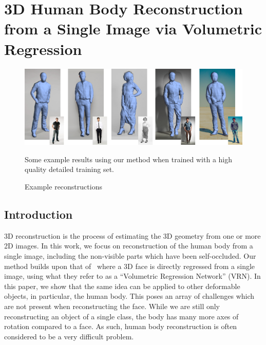 \graphicspath{{chapter_humans/}}
\chapter{3D Human Body Reconstruction from a Single Image via
  Volumetric Regression}



\begin{figure}[h!]
  \centering
  \includegraphics[width=0.8\linewidth]{img/demo.png}
  \caption{Example reconstructions}{Some example results using our
    method when trained with a high quality detailed training set.}
  \label{fig:topdemo}
\end{figure}


\section{Introduction}


3D reconstruction is the process of estimating the 3D geometry from
one or more 2D images. In this work, we focus on reconstruction of the
human body from a single image, including the non-visible parts which
have been self-occluded. Our method builds upon that
of~\cite{jackson2017vrn} where a 3D face is directly regressed from a
single image, using what they refer to as a ``Volumetric Regression
Network'' (VRN). In this paper, we show that the same idea can be applied to
other deformable objects, in particular, the human body. This poses an
array of challenges which are not present when reconstructing the
face. While we are still only reconstructing an object of a single
class, the body has many more axes of rotation compared to a face. As
such, human body reconstruction is often considered to be a very
difficult problem.

